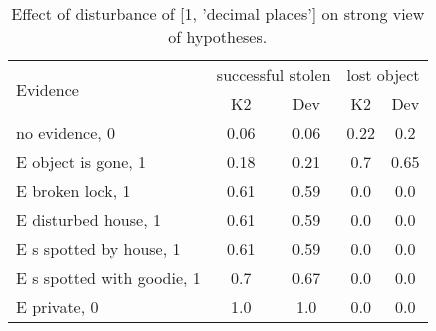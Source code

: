 \begin{table}\begin{tabular}{l|cc|cc}\toprule\multirow{2}{*}{Evidence} & \multicolumn{2}{c}{successful stolen}& \multicolumn{2}{c}{lost object}\\& {K2} & {Dev}& {K2} & {Dev}\\\midrule
no evidence, 0 & 0.06&0.06&0.22&0.2\\E object is gone, 1 & 0.18&0.21&0.7&0.65\\E broken lock, 1 & 0.61&0.59&0.0&0.0\\E disturbed house, 1 & 0.61&0.59&0.0&0.0\\E s spotted by house, 1 & 0.61&0.59&0.0&0.0\\E s spotted with goodie, 1 & 0.7&0.67&0.0&0.0\\E private, 0 & 1.0&1.0&0.0&0.0\\\bottomrule\end{tabular}\caption{Effect of disturbance of [1, 'decimal places'] on strong view of hypotheses.}\end{table}